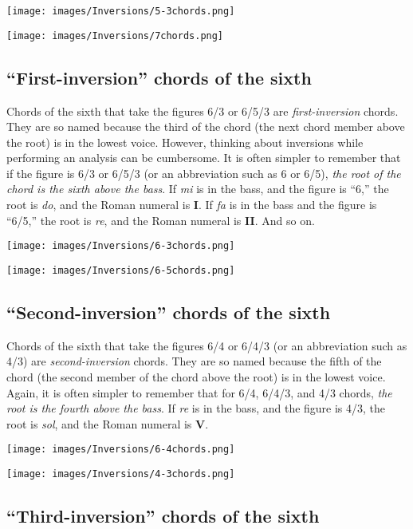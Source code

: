 \documentclass{book}
\begin{document}
\texttt{[image: images/Inversions/5-3chords.png]}

\texttt{[image: images/Inversions/7chords.png]}

\hypertarget{first-inversion-chords-of-the-sixth}{%
\subsection{``First-inversion'' chords of the
sixth}\label{first-inversion-chords-of-the-sixth}}

Chords of the sixth that take the figures 6/3 or 6/5/3 are
\emph{first-inversion} chords. They are so named because the third of the
chord (the next chord member above the root) is in the lowest voice. However,
thinking about inversions while performing an analysis can be cumbersome. It
is often simpler to remember that if the figure is 6/3 or 6/5/3 (or an
abbreviation such as 6 or 6/5), \emph{the root of the chord is the sixth above
the bass}. If \emph{mi} is in the bass, and the figure is ``6,'' the root is
\emph{do}, and the Roman numeral is \textbf{I}. If \emph{fa} is in the bass
and the figure is ``6/5,'' the root is \emph{re}, and the Roman numeral is
\textbf{II}. And so on.

\texttt{[image: images/Inversions/6-3chords.png]}

\texttt{[image: images/Inversions/6-5chords.png]}

\hypertarget{second-inversion-chords-of-the-sixth}{%
\subsection{``Second-inversion'' chords of the
sixth}\label{second-inversion-chords-of-the-sixth}}

Chords of the sixth that take the figures 6/4 or 6/4/3 (or an abbreviation
such as 4/3) are \emph{second-inversion} chords. They are so named because the
fifth of the chord (the second member of the chord above the root) is in the
lowest voice. Again, it is often simpler to remember that for 6/4, 6/4/3, and
4/3 chords, \emph{the root is the fourth above the bass}. If \emph{re} is in
the bass, and the figure is 4/3, the root is \emph{sol}, and the Roman numeral
is \textbf{V}.

\texttt{[image: images/Inversions/6-4chords.png]}

\texttt{[image: images/Inversions/4-3chords.png]}

\hypertarget{third-inversion-chords-of-the-sixth}{%
\subsection{``Third-inversion'' chords of the
sixth}\label{third-inversion-chords-of-the-sixth}}
\end{document}
